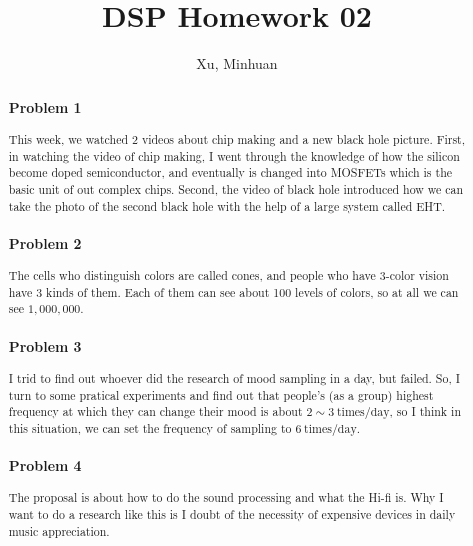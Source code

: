 \documentclass{article}
\begin{document}
\title{DSP Homework 02}
\author{Xu, Minhuan}
\maketitle
\tableofcontents

\begin{abstract}
    \subsubsection*{Problem 1}
    This week, we watched 2 videos about chip making and a new black hole picture. First, in watching the video of chip making, I went through the knowledge of how the silicon become doped semiconductor, and eventually is changed into MOSFETs which is the basic unit of out complex chips. Second, the video of black hole introduced how we can take the photo of the second black hole with the help of a large system called EHT.

    \subsubsection*{Problem 2}

    The cells who distinguish colors are called cones, and people who have 3-color vision have 3 kinds of them. Each of them can see about 100 levels of colors, so at all we can see $1,000,000$.

    \subsubsection*{Problem 3}

    I trid to find out whoever did the research of mood sampling in a day, but failed. So, I turn to some pratical experiments and find out that people's (as a group) highest frequency at which they can change their mood is about $2\sim 3 ~ \mathrm{times/day}$, so I think in this situation, we can set the frequency of sampling to $6~\mathrm{times/day}$.

    \subsubsection*{Problem 4}

    The proposal is about how to do the sound processing and what the Hi-fi is. Why I want to do a research like this is I doubt of the necessity of expensive devices in daily music appreciation.


\end{abstract}
\end{document}
